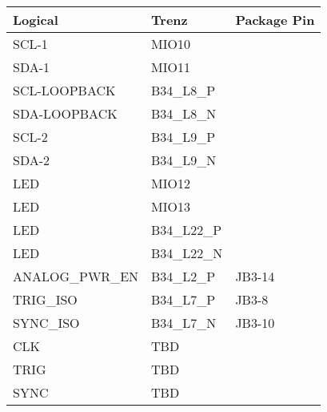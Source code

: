 \documentclass[12pt]{article}
\begin{document}
\newpage

\begin{tabular}{lll}
\hline
Logical & Trenz & Package Pin \\  
\hline
SCL-1          & MIO10        & \\
SDA-1          & MIO11        & \\
SCL-LOOPBACK   & B34\_L8\_P   & \\
SDA-LOOPBACK   & B34\_L8\_N   & \\
SCL-2          & B34\_L9\_P   & \\
SDA-2          & B34\_L9\_N   & \\
LED            & MIO12        & \\
LED            & MIO13        & \\
LED            & B34\_L22\_P  & \\
LED            & B34\_L22\_N  & \\
ANALOG\_PWR\_EN  & B34\_L2\_P & JB3-14 \\ 
TRIG\_ISO       & B34\_L7\_P & JB3-8 \\
SYNC\_ISO       & B34\_L7\_N & JB3-10 \\
CLK  & TBD & \\
TRIG & TBD & \\
SYNC & TBD & \\
\hline
\end{tabular}

\newpage
\end{document}
